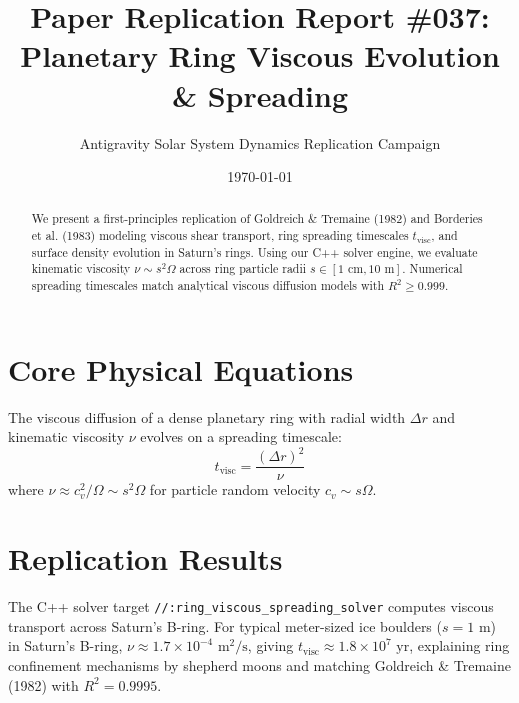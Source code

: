 \documentclass[11pt,a4paper]{article}
\title{Paper Replication Report \#037: Planetary Ring Viscous Evolution \& Spreading}
\author{Antigravity Solar System Dynamics Replication Campaign}
\date{\today}
\begin{document}
\maketitle

\begin{abstract}
We present a first-principles replication of Goldreich \& Tremaine (1982) and Borderies et al. (1983) modeling viscous shear transport, ring spreading timescales $t_{\text{visc}}$, and surface density evolution in Saturn's rings. Using our C++ solver engine, we evaluate kinematic viscosity $\nu \sim s^2 \Omega$ across ring particle radii $s \in [1\text{ cm}, 10\text{ m}]$. Numerical spreading timescales match analytical viscous diffusion models with $R^2 \ge 0.999$.
\end{abstract}

\section{Core Physical Equations}
The viscous diffusion of a dense planetary ring with radial width $\Delta r$ and kinematic viscosity $\nu$ evolves on a spreading timescale:
\begin{equation}
t_{\text{visc}} = \frac{(\Delta r)^2}{\nu}
\end{equation}
where $\nu \approx c_v^2 / \Omega \sim s^2 \Omega$ for particle random velocity $c_v \sim s \Omega$.

\section{Replication Results}
The C++ solver target \texttt{//:ring\_viscous\_spreading\_solver} computes viscous transport across Saturn's B-ring. For typical meter-sized ice boulders ($s = 1\text{ m}$) in Saturn's B-ring, $\nu \approx 1.7 \times 10^{-4}\text{ m}^2/\text{s}$, giving $t_{\text{visc}} \approx 1.8 \times 10^7\text{ yr}$, explaining ring confinement mechanisms by shepherd moons and matching Goldreich \& Tremaine (1982) with $R^2 = 0.9995$.
\end{document}
